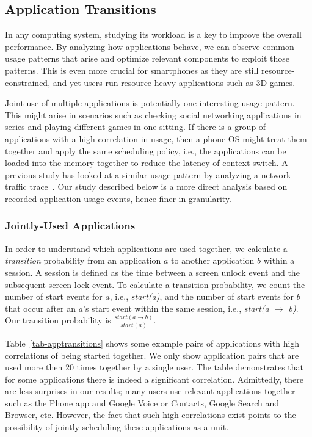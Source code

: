 \subsection{Application Transitions}
\label{subsec-apptransitions}



In any computing system, studying its workload is a key to improve the overall
performance. By analyzing how applications behave, we can observe common usage
patterns that arise and optimize relevant components to exploit those patterns.
This is even more crucial for smartphones as they are still
resource-constrained, and yet users run resource-heavy applications such as 3D
games.

Joint use of multiple applications is potentially one interesting usage pattern.
This might arise in scenarios such as checking social networking applications in
series and playing different games in one sitting. If there is a group of
applications with a high correlation in usage, then a phone OS might treat them
together and apply the same scheduling policy, i.e., the applications can be
loaded into the memory together to reduce the latency of context switch.
A previous study has looked at a similar usage pattern by analyzing a network
traffic trace~\cite{xu:imc:2011}. Our study described below is a more direct
analysis based on recorded application usage events, hence finer in granularity.

\subsubsection{Jointly-Used Applications}
In order to understand which applications are used together, we calculate a {\it
transition} probability from an application $a$ to another application $b$
within a session. A session is defined as the time between a screen unlock event
and the subsequent screen lock event. To calculate a transition probability, we
count the number of start events for $a$, i.e., {\it start(a)}, and the number
of start events for $b$ that occur after an $a$'s start event within the same
session, i.e., {\it start(a $\rightarrow$ b)}. Our transition probability is
$\frac{start(a \rightarrow b)}{start(a)}$.

Table~\ref{tab-apptransitions} shows some example pairs of applications with
high correlations of being started together. We only show application pairs that
are used more then 20 times together by a single user. The table demonstrates
that for some applications there is indeed a significant correlation.
Admittedly, there are less surprises in our results; many users use
relevant applications together such as the Phone app and Google Voice or
Contacts, Google Search and Browser, etc. However, the fact that such high
correlations exist points to the possibility of jointly scheduling these
applications as a unit.

